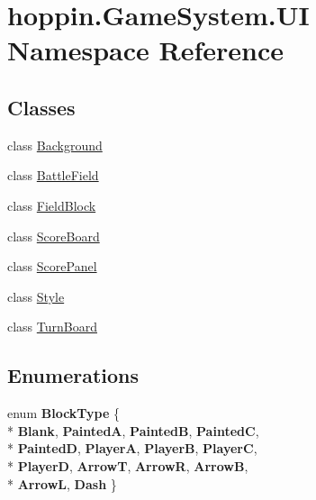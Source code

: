 \hypertarget{namespacehoppin_1_1_game_system_1_1_u_i}{}\section{hoppin.\+Game\+System.\+UI Namespace Reference}
\label{namespacehoppin_1_1_game_system_1_1_u_i}
\subsection*{Classes}
\begin{DoxyCompactItemize}
\item 
class \hyperlink{classhoppin_1_1_game_system_1_1_u_i_1_1_background}{Background}
\item 
class \hyperlink{classhoppin_1_1_game_system_1_1_u_i_1_1_battle_field}{Battle\+Field}
\item 
class \hyperlink{classhoppin_1_1_game_system_1_1_u_i_1_1_field_block}{Field\+Block}
\item 
class \hyperlink{classhoppin_1_1_game_system_1_1_u_i_1_1_score_board}{Score\+Board}
\item 
class \hyperlink{classhoppin_1_1_game_system_1_1_u_i_1_1_score_panel}{Score\+Panel}
\item 
class \hyperlink{classhoppin_1_1_game_system_1_1_u_i_1_1_style}{Style}
\item 
class \hyperlink{classhoppin_1_1_game_system_1_1_u_i_1_1_turn_board}{Turn\+Board}
\end{DoxyCompactItemize}
\subsection*{Enumerations}
\begin{DoxyCompactItemize}
\item 
enum {\bfseries Block\+Type} \{ \\*
{\bfseries Blank}, 
{\bfseries PaintedA}, 
{\bfseries PaintedB}, 
{\bfseries PaintedC}, 
\\*
{\bfseries PaintedD}, 
{\bfseries PlayerA}, 
{\bfseries PlayerB}, 
{\bfseries PlayerC}, 
\\*
{\bfseries PlayerD}, 
{\bfseries ArrowT}, 
{\bfseries ArrowR}, 
{\bfseries ArrowB}, 
\\*
{\bfseries ArrowL}, 
{\bfseries Dash}
 \}\hypertarget{namespacehoppin_1_1_game_system_1_1_u_i_a076fdce4c1417d8dc19f5c9a9696cd5b}{}\label{namespacehoppin_1_1_game_system_1_1_u_i_a076fdce4c1417d8dc19f5c9a9696cd5b}

\end{DoxyCompactItemize}
